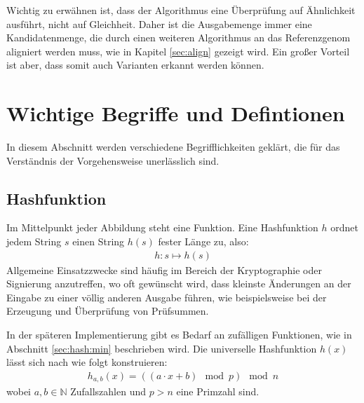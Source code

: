 Wichtig zu erwähnen ist, dass der Algorithmus eine Überprüfung auf Ähnlichkeit ausführt, nicht auf Gleichheit. Daher ist die Ausgabemenge immer eine Kandidatenmenge, die durch einen weiteren Algorithmus an das Referenzgenom aligniert werden muss, wie in Kapitel \ref{sec:align} gezeigt wird. Ein großer Vorteil ist aber, dass somit auch Varianten erkannt werden können. 

\section{Wichtige Begriffe und Defintionen}
In diesem Abschnitt werden verschiedene Begrifflichkeiten geklärt, die für das Verständnis der Vorgehensweise unerlässlich sind.
\subsection{Hashfunktion}
\label{sec:hash:func}
Im Mittelpunkt jeder Abbildung steht eine Funktion. Eine Hashfunktion $h$ ordnet jedem String $s$ einen String $h(s)$ fester Länge zu, also:
\begin{align*}
	h: s \mapsto h(s)
\end{align*}
Allgemeine Einsatzzwecke sind häufig im Bereich der Kryptographie oder Signierung anzutreffen, wo oft gewünscht wird, dass kleinste Änderungen an der Eingabe zu einer völlig anderen Ausgabe führen, wie beispielsweise bei der Erzeugung und Überprüfung von Prüfsummen.

In der späteren Implementierung gibt es Bedarf an zufälligen Funktionen, wie in Abschnitt \ref{sec:hash:min} beschrieben wird. Die universelle Hashfunktion $h(x)$ lässt sich nach \citet{Leskovec2014a} wie folgt konstruieren:
\begin{align*}
	h_{a,b}(x) = ((a \cdot x + b) \mod p) \mod n
\end{align*}
wobei $a, b \in \mathbb{N}$ Zufallszahlen und $p > n$ eine Primzahl sind.
